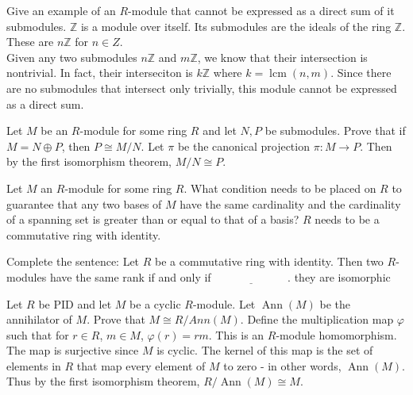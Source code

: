 \documentclass[avery5371,grid]{flashcards}
\newcommand{\Z}{\mathbb{Z}}
\newcommand{\blank}{$\; \underline{\hspace{1in}} \; $}
\DeclareMathOperator{\Ann}{Ann}
\DeclareMathOperator{\lcm}{lcm}
\let \phi \varphi
\begin{document}
\begin{flashcard}[Modules]{Give an example of an $R$-module that cannot be expressed as a direct sum of it submodules.}
 $\Z$ is a module over itself. Its submodules are the ideals of the ring $\Z$. These are $n\Z$ for $n \in Z$.\\
 
 Given any two submodules $n\Z$ and $m\Z$, we know that their intersection is nontrivial. In fact, their interseciton is $k\Z$ where $k = \lcm(n,m).$ Since there are no submodules that intersect only trivially, this module cannot be expressed as a direct sum.
\end{flashcard}

\begin{flashcard}[Modules]{Let $M$ be an $R$-module for some ring $R$ and let $N,P$ be submodules. Prove that if $M = N \oplus P$, then $P \cong M/N.$}
 Let $\pi$ be the canonical projection $\pi: M \to P$. Then by the first isomorphism theorem, $M/N \cong P$.
\end{flashcard}

\begin{flashcard}[Modules]{Let $M$ an $R$-module for some ring $R$. What condition needs to be placed on $R$ to guarantee that any two bases of $M$ have the same cardinality and the cardinality of a spanning set is greater than or equal to that of a basis?}
 $R$ needs to be a commutative ring with identity.
\end{flashcard}

\begin{flashcard}[Modules]{Complete the sentence: Let $R$ be a commutative ring with identity. Then two $R$-modules have the same rank if and only if \blank.}
 they are isomorphic
\end{flashcard}

\begin{flashcard}[Modules]{Let $R$ be  PID and let $M$ be a cyclic $R$-module. Let $\Ann(M)$ be the annihilator of $M$. Prove that $M \cong R/Ann(M)$.}
 Define the multiplication map $\phi$ such that for $r \in R$, $m \in M$, $\phi(r) = rm$. This is an $R$-module homomorphism. The map is surjective since $M$ is cyclic. The kernel of this map is the set of elements in $R$ that map every element of $M$ to zero - in other words, $\Ann(M)$. Thus by the first isomorphism theorem, $R/\Ann(M) \cong M.$
\end{flashcard}
\end{document}
